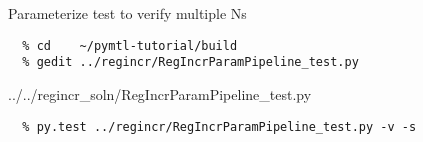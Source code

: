 \begin{task}\begin{frame}[fragile]{Parameterize test to verify multiple Ns}
\vspace{-0.25in}
\begin{verbatim}
  % cd    ~/pymtl-tutorial/build
  % gedit ../regincr/RegIncrParamPipeline_test.py
\end{verbatim}

%
{../../regincr_soln/RegIncrParamPipeline_test.py}

\begin{verbatim}
  % py.test ../regincr/RegIncrParamPipeline_test.py -v -s
\end{verbatim}
\end{frame}
\end{task}

